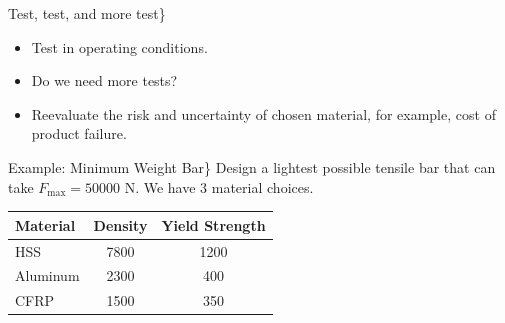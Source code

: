 \documentclass[10pt, svgnames]{beamer}
\begin{document}
\begin{frame}[label={sec:org8ccce44}]{Test, test, and more test\}}
\begin{itemize}
\item Test in operating conditions.
\item Do we need more tests?
\item Reevaluate the risk and uncertainty of chosen material, for example, cost of product failure.
\end{itemize}

\centering
{}
\end{frame}


\begin{frame}[label={sec:org4868795}]{Example: Minimum Weight Bar\}}
Design a lightest possible tensile bar that can take \(F_{\max} = 50000 \text{ N}\). We have 3 material choices.
\vspace{5mm}

\centering
\begin{tabular}{lcc}
  \toprule
  Material & Density & Yield Strength \\
  \midrule
  HSS    & 7800    & 1200 \\
  Aluminum & 2300    & 400 \\
  CFRP     & 1500    & 350 \\
  \bottomrule
\end{tabular}
\end{frame}
\end{document}
